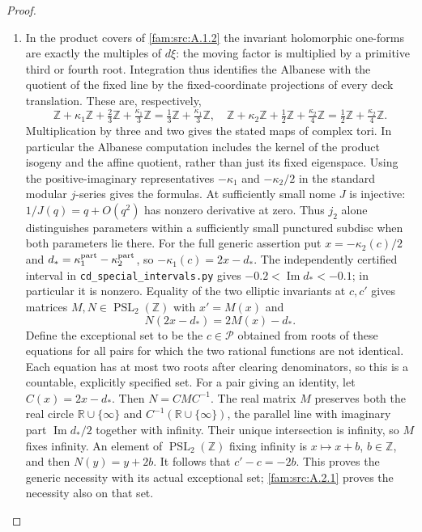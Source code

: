 \begin{proof}
\begin{enumerate}[label=\arabic*.,leftmargin=*]
\item In the product covers of \ref{fam:src:A.1.2} the invariant holomorphic one-forms are exactly the multiples of $d\xi$: the moving factor is multiplied by a primitive third or fourth root. Integration thus identifies the Albanese with the quotient of the fixed line by the fixed-coordinate projections of every deck translation. These are, respectively,
\[
 \mathbb Z+\kappa_1\mathbb Z+\tfrac23\mathbb Z+\tfrac{\kappa_1}3\mathbb Z
   =\tfrac13\mathbb Z+\tfrac{\kappa_1}3\mathbb Z,
\quad
 \mathbb Z+\kappa_2\mathbb Z+\tfrac12\mathbb Z+\tfrac{\kappa_2}4\mathbb Z
   =\tfrac12\mathbb Z+\tfrac{\kappa_2}4\mathbb Z.
\]
Multiplication by three and two gives the stated maps of complex tori. In particular the Albanese computation includes the kernel of the product isogeny and the affine quotient, rather than just its fixed eigenspace. Using the positive-imaginary representatives $-\kappa_1$ and $-\kappa_2/2$ in the standard modular $j$-series gives the formulas. At sufficiently small nome $J$ is injective: $1/J(q)=q+O(q^2)$ has nonzero derivative at zero. Thus $j_2$ alone distinguishes parameters within a sufficiently small punctured subdisc when both parameters lie there. For the full generic assertion put $x=-\kappa_2(c)/2$ and $d_*=\kappa_1^{\rm part}-\kappa_2^{\rm part}$, so $-\kappa_1(c)=2x-d_*$. The independently certified interval in \texttt{cd\_special\_intervals.py} gives $-0.2<\operatorname{Im}d_*<-0.1$; in particular it is nonzero. Equality of the two elliptic invariants at $c,c'$ gives matrices $M,N\in\operatorname{PSL}_2(\mathbb Z)$ with $x'=M(x)$ and
\[
 N(2x-d_*)=2M(x)-d_*.
\]
Define the exceptional set to be the $c\in\mathcal P$ obtained from roots of these equations for all pairs for which the two rational functions are not identical. Each equation has at most two roots after clearing denominators, so this is a countable, explicitly specified set. For a pair giving an identity, let $C(x)=2x-d_*$. Then $N=CMC^{-1}$. The real matrix $M$ preserves both the real circle $\mathbb R\cup\{\infty\}$ and $C^{-1}(\mathbb R\cup\{\infty\})$, the parallel line with imaginary part $\operatorname{Im}d_*/2$ together with infinity. Their unique intersection is infinity, so $M$ fixes infinity. An element of $\operatorname{PSL}_2(\mathbb Z)$ fixing infinity is $x\mapsto x+b$, $b\in\mathbb Z$, and then $N(y)=y+2b$. It follows that $c'-c=-2b$. This proves the generic necessity with its actual exceptional set; \ref{fam:src:A.2.1} proves the necessity also on that set.
\end{enumerate}
\end{proof}

